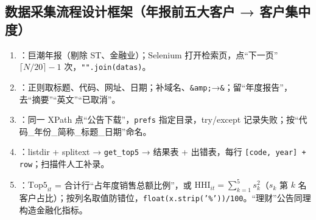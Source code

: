 \subsection{数据采集流程设计框架（年报前五大客户 → 客户集中度）}
\begin{enumerate}
\item {}：巨潮年报（剔除 ST、金融业）；Selenium 打开检索页，点“下一页” $\lceil N/20\rceil-1$ 次，\texttt{"".join(datas)}。
\item {}：正则取标题、代码、网址、日期；补域名、\texttt{\&amp;}→\texttt{\&}；留“年度报告”，去“摘要”“英文”“已取消”。
\item {}：同一 XPath 点“公告下载”，\texttt{prefs} 指定目录，try/except 记录失败；按“代码\_年份\_简称\_标题\_日期”命名。
\item {}：listdir + splitext → \texttt{get\_top5} → 结果表 + 出错表，每行 \texttt{[code, year] + row}；扫描件人工补录。
\item {}：$\text{Top5}_{it}$ = 合计行“占年度销售总额比例”，或 $\text{HHI}_{it}=\sum_{k=1}^{5}s_{k}^{2}$（$s_k$ 第 $k$ 名客户占比）；按列名取值防错位，\texttt{float(x.strip('\%'))/100}。“理财”公告同理构造金融化指标。
\end{enumerate}
\endgroup
